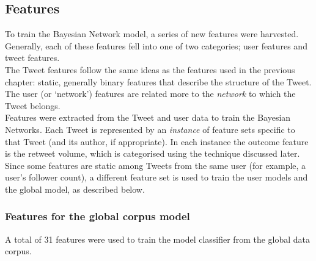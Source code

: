 \begin{enumerate}
\subsection{Features}
To train the Bayesian Network model, a series of new features were harvested. Generally, each of these features fell into one of two categories; user features and tweet features.
\\
The Tweet features follow the same ideas as the features used in the previous chapter: static, generally binary features that describe the structure of the Tweet. The user (or `network')  features are related more to the \emph{network} to which the Tweet belongs.\\

Features were extracted from the Tweet and user data to train the Bayesian Networks. Each Tweet is represented by an \textit{instance} of feature sets specific to that Tweet (and its author, if appropriate). In each instance the outcome feature is the retweet volume, which is categorised using the technique discussed later.\\
Since some features are static among Tweets from the same user (for example, a user's follower count), a different feature set is used to train the user models and the global model, as described below.

\subsubsection{Features for the global corpus model}
A total of 31 features were used to train the model classifier from the global data corpus.


\end{enumerate}
